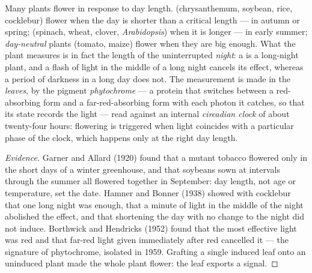\begin{proposition}\label{prop:b2:plant-flowering:photoperiod}
Many plants flower in response to day length. \emph{} (chrysanthemum, soybean, rice, cocklebur) flower when the
day is shorter than a critical length --- in autumn or spring;
\emph{} (spinach, wheat, clover, \emph{Arabidopsis})
when it is longer --- in early summer; \emph{day-neutral} plants
(tomato, maize) flower when they are big enough. What the plant
measures is in fact the length of the uninterrupted \emph{night}: a
 is a long-night plant, and a flash of light in the
middle of a long night cancels its effect, whereas a period of
darkness in a long day does not. The measurement is made in the
\emph{leaves}, by the pigment \emph{phytochrome} --- a protein that
switches between a red-absorbing form and a far-red-absorbing form
with each photon it catches, so that its state records the light
--- read against an internal \emph{circadian clock} of about
twenty-four hours: flowering is triggered when light coincides with
a particular phase of the clock, which happens only at the right
day length.
\end{proposition}
\begin{proof}[Evidence]
Garner and Allard (1920) found that a mutant tobacco flowered only
in the short days of a winter greenhouse, and that soybeans sown at
intervals through the summer all flowered together in September:
day length, not age or temperature, set the date. Hamner and Bonner
(1938) showed with cocklebur that one long night was enough, that
a minute of light in the middle of the night abolished the effect,
and that shortening the day with no change to the night did not
induce. Borthwick and Hendricks (1952) found that the most
effective light was red and that far-red light given immediately
after red cancelled it --- the signature of phytochrome, isolated
in 1959. Grafting a single induced leaf onto an uninduced plant made
the whole plant flower: the leaf exports a signal.
\end{proof}

